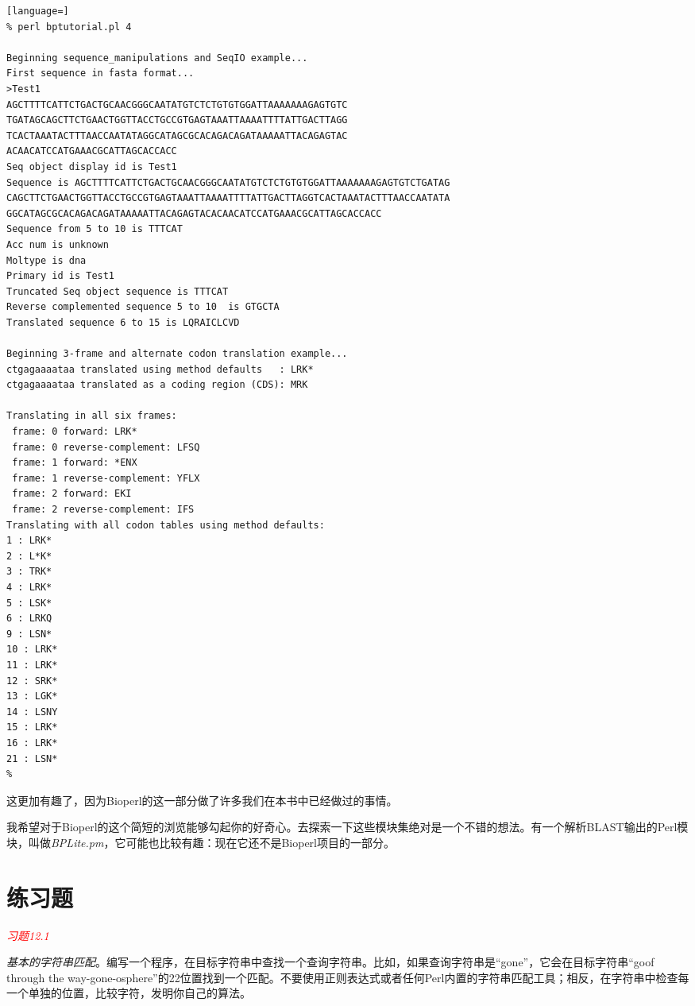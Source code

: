 \begin{lstlisting}[language=]
% perl bptutorial.pl 4

Beginning sequence_manipulations and SeqIO example... 
First sequence in fasta format... 
>Test1
AGCTTTTCATTCTGACTGCAACGGGCAATATGTCTCTGTGTGGATTAAAAAAAGAGTGTC
TGATAGCAGCTTCTGAACTGGTTACCTGCCGTGAGTAAATTAAAATTTTATTGACTTAGG
TCACTAAATACTTTAACCAATATAGGCATAGCGCACAGACAGATAAAAATTACAGAGTAC
ACAACATCCATGAAACGCATTAGCACCACC
Seq object display id is Test1
Sequence is AGCTTTTCATTCTGACTGCAACGGGCAATATGTCTCTGTGTGGATTAAAAAAAGAGTGTCTGATAG
CAGCTTCTGAACTGGTTACCTGCCGTGAGTAAATTAAAATTTTATTGACTTAGGTCACTAAATACTTTAACCAATATA
GGCATAGCGCACAGACAGATAAAAATTACAGAGTACACAACATCCATGAAACGCATTAGCACCACC 
Sequence from 5 to 10 is TTTCAT 
Acc num is unknown 
Moltype is dna 
Primary id is Test1 
Truncated Seq object sequence is TTTCAT 
Reverse complemented sequence 5 to 10  is GTGCTA  
Translated sequence 6 to 15 is LQRAICLCVD 

Beginning 3-frame and alternate codon translation example... 
ctgagaaaataa translated using method defaults   : LRK*
ctgagaaaataa translated as a coding region (CDS): MRK

Translating in all six frames:
 frame: 0 forward: LRK*
 frame: 0 reverse-complement: LFSQ
 frame: 1 forward: *ENX
 frame: 1 reverse-complement: YFLX
 frame: 2 forward: EKI
 frame: 2 reverse-complement: IFS
Translating with all codon tables using method defaults:
1 : LRK*
2 : L*K*
3 : TRK*
4 : LRK*
5 : LSK*
6 : LRKQ
9 : LSN*
10 : LRK*
11 : LRK*
12 : SRK*
13 : LGK*
14 : LSNY
15 : LRK*
16 : LRK*
21 : LSN*
% 
\end{lstlisting}

这更加有趣了，因为Bioperl的这一部分做了许多我们在本书中已经做过的事情。

我希望对于Bioperl的这个简短的浏览能够勾起你的好奇心。去探索一下这些模块集绝对是一个不错的想法。有一个解析BLAST输出的Perl模块，叫做\textit{BPLite.pm}，它可能也比较有趣：现在它还不是Bioperl项目的一部分。

\section{练习题}
\textcolor{red}{\textit{习题12.1}}
\begin{adjustwidth}{1cm}{}
\textit{基本的字符串匹配}。编写一个程序，在目标字符串中查找一个查询字符串。比如，如果查询字符串是“gone”，它会在目标字符串“goof through the way-gone-osphere”的22位置找到一个匹配。不要使用正则表达式或者任何Perl内置的字符串匹配工具；相反，在字符串中检查每一个单独的位置，比较字符，发明你自己的算法。
\end{adjustwidth}

